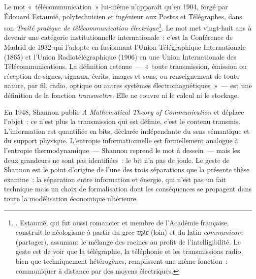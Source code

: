 Le mot «~télécommunication~» lui-même n'apparaît qu'en 1904, forgé par Édouard Estaunié, polytechnicien et ingénieur aux Postes et Télégraphes, dans son \emph{Traité pratique de télécommunication électrique}\footnote{\textcite{estaunie_traite_1904}. Estaunié, qui fut aussi romancier et membre de l'Académie française, construit le néologisme à partir du grec \emph{τηλε} (loin) et du latin \emph{communicare} (partager), assumant le mélange des racines au profit de l'intelligibilité. Le geste est de voir que la télégraphie, la téléphonie et les transmissions radio, bien que techniquement hétérogènes, remplissent une même fonction~: communiquer à distance par des moyens électriques.}. Le mot met vingt-huit ans à devenir une catégorie institutionnelle internationale~: c'est la Conférence de Madrid de 1932 qui l'adopte en fusionnant l'Union Télégraphique Internationale (1865) et l'Union Radiotélégraphique (1906) en une Union Internationale des Télécommunications. La définition retenue~--- «~toute transmission, émission ou réception de signes, signaux, écrits, images et sons, ou renseignement de toute nature, par fil, radio, optique ou autres systèmes électromagnétiques~»~--- est une définition de la fonction \emph{transmettre}. Elle ne couvre ni le calcul ni le stockage.

En 1948, Shannon publie \emph{A Mathematical Theory of Communication} et déplace l'objet~: ce n'est plus la transmission qui est définie, c'est le contenu transmis. L'information est quantifiée en bits, déclarée indépendante du sens sémantique et du support physique. L'entropie informationnelle est formellement analogue à l'entropie thermodynamique~--- Shannon reprend le mot à dessein~--- mais les deux grandeurs ne sont pas identifiées~: le bit n'a pas de joule. Le geste de Shannon est le point d'origine de l'une des trois séparations que la présente thèse examine~: la séparation entre information et énergie, qui n'est pas un fait technique mais un choix de formalisation dont les conséquences se propagent dans toute la modélisation économique ultérieure.

